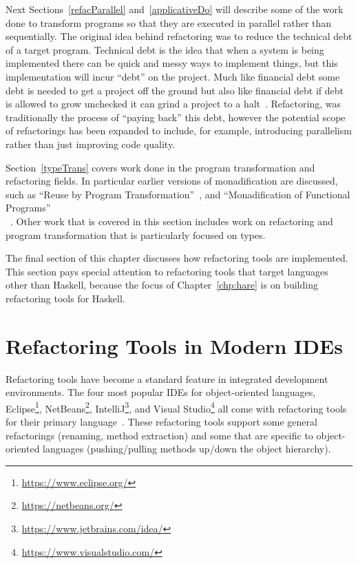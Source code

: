 Next Sections~\ref{refacParallel} and~\ref{applicativeDo} will describe some of the work done to transform programs so that they are executed in parallel rather than sequentially. The original idea behind refactoring was to reduce the technical debt of a target program. Technical debt is the idea that when a system is being implemented there can be quick and messy ways to implement things, but this implementation will incur ``debt'' on the project. Much like financial debt some debt is needed to get a project off the ground but also like financial debt if debt is allowed to grow unchecked it can grind a project to a halt~\citep{techDebt}. Refactoring, was traditionally the process of ``paying back'' this debt, however the potential scope of refactorings has been expanded to include, for example, introducing parallelism rather than just improving code quality. 

Section~\ref{typeTrans} covers work done in the program transformation and refactoring fields. In particular earlier versions of monadification are discussed, such as ``Reuse by Program Transformation''~\citep{lammelReuse}, and ``Monadification of Functional Programs''\\~\citep{monadification}. Other work that is covered in this section includes work on refactoring and program transformation that is particularly focused on types.

The final section of this chapter discusses how refactoring tools are implemented. This section pays special attention to refactoring tools that target languages other than Haskell, because the focus of Chapter~\ref{chp:hare} is on building refactoring tools for Haskell.

\section{Refactoring Tools in Modern IDEs}\label{ideTools}
Refactoring tools have become a standard feature in integrated development environments. The four most popular IDEs for object-oriented languages, Eclipse\footnote{\url{https://www.eclipse.org/}}, NetBeans\footnote{\url{https://netbeans.org/}}, IntelliJ\footnote{\url{https://www.jetbrains.com/idea/}}, and Visual Studio\footnote{\url{https://www.visualstudio.com/}} all come with refactoring tools for their primary language~\citep{ides}. These refactoring tools support some general refactorings (renaming, method extraction) and some that are specific to object-oriented languages (pushing/pulling methods up/down the object hierarchy). 

